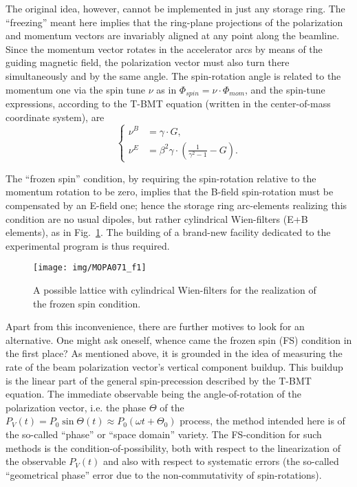 \documentclass[a4paper]{jacow}
\begin{document}
The original idea, however, cannot be implemented in just any storage ring. The ``freezing'' meant here implies that the ring-plane projections of the polarization and momentum vectors are invariably aligned at any point along the beamline. Since the momentum vector rotates in the accelerator arcs by means of the guiding magnetic field, the polarization vector must also turn there simultaneously and by the same angle. The spin-rotation angle is related to the momentum one via the spin tune $\nu$ as in $\Phi_{spin} = \nu\cdot\Phi_{mom}$, and the spin-tune expressions, according to the T-BMT equation (written in the center-of-mass coordinate system), are~\cite{ICAP15:Lattices}
\begin{equation}\label{eq:spin-tune}
	\begin{cases}
		\nu^{B} &= \gamma\cdot G,\\
		\nu^{E} &= \beta^2\gamma\cdot\left(\frac{1}{\gamma^2-1} - G\right).
	\end{cases}
\end{equation}

The ``frozen spin'' condition, by requiring the spin-rotation relative to the momentum rotation to be zero, implies that the B-field spin-rotation must be compensated by an E-field one; hence the storage ring arc-elements realizing this condition are no usual dipoles, but rather cylindrical Wien-filters (E+B elements), as in Fig.~\ref{fig:FS-lattice}. The building of a brand-new facility dedicated to the experimental program is thus required.

\begin{figure}[h]
	\texttt{[image: img/MOPA071\_f1]}
	\caption{A possible lattice with cylindrical Wien-filters for the realization of the frozen spin condition.\label{fig:FS-lattice}}
\end{figure}

Apart from this inconvenience, there are further motives to look for an alternative. One might ask oneself, whence came the frozen spin (FS) condition in the first place? As mentioned above, it is grounded in the idea of measuring the rate of the beam polarization vector's vertical component buildup. This buildup is the linear part of the general spin-precession described by the T-BMT equation. The immediate observable being the angle-of-rotation of the polarization vector, i.e. the phase $\Theta$ of the $P_V (t) = P_0\sin \Theta(t) \approx P_0(\omega t + \Theta_0)$ process, the method intended here is of the so-called ``phase'' or ``space domain'' variety. The FS-condition for such methods is the condition-of-possibility, both with respect to the linearization of the observable $P_V(t)$ and also with respect to systematic errors (the so-called ``geometrical phase'' error due to the non-commutativity of spin-rotations).
\end{document}
